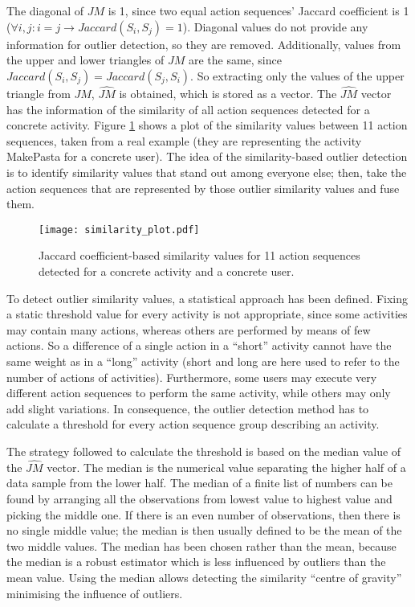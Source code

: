 The diagonal of $JM$ is 1, since two equal action sequences' Jaccard coefficient is 1 ($\forall i, j : i = j \rightarrow Jaccard(S_i, S_j) = 1$). Diagonal values do not provide any information for outlier detection, so they are removed. Additionally, values from the upper and lower triangles of $JM$ are the same, since $Jaccard(S_i, S_j) = Jaccard(S_j, S_i)$. So extracting only the values of the upper triangle from $JM$, $\hat{JM}$ is obtained, which is stored as a vector. The $\hat{JM}$ vector has the information of the similarity of all action sequences detected for a concrete activity. Figure \ref{fig-similarity} shows a plot of the similarity values between 11 action sequences, taken from a real example (they are representing the activity MakePasta for a concrete user). The idea of the similarity-based outlier detection is to identify similarity values that stand out among everyone else; then, take the action sequences that are represented by those outlier similarity values and fuse them.  

\begin{figure}[htbp]
\centering
\texttt{[image: similarity\_plot.pdf]}
    \caption{Jaccard coefficient-based similarity values for 11 action sequences detected for a concrete activity and a concrete user.}
    \label{fig-similarity}
\end{figure}

To detect outlier similarity values, a statistical approach has been defined. Fixing a static threshold value for every activity is not appropriate, since some activities may contain many actions, whereas others are performed by means of few actions. So a difference of a single action in a ``short'' activity cannot have the same weight as in a ``long'' activity (short and long are here used to refer to the number of actions of activities). Furthermore, some users may execute very different action sequences to perform the same activity, while others may only add slight variations. In consequence, the outlier detection method has to calculate a threshold for every action sequence group describing an activity. 

The strategy followed to calculate the threshold is based on the median value of the $\hat{JM}$ vector. The median is the numerical value separating the higher half of a data sample from the lower half. The median of a finite list of numbers can be found by arranging all the observations from lowest value to highest value and picking the middle one. If there is an even number of observations, then there is no single middle value; the median is then usually defined to be the mean of the two middle values. The median has been chosen rather than the mean, because the median is a robust estimator which is less influenced by outliers than the mean value. Using the median allows detecting the similarity ``centre of gravity'' minimising the influence of outliers. %

